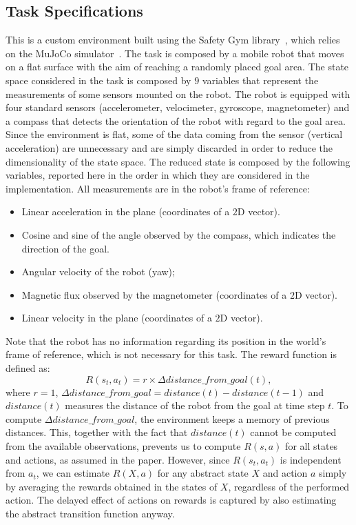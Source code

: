 \subsection*{Task Specifications}
This is a custom environment built using the Safety Gym library~\citep{ray2019benchmarking}, which relies on the MuJoCo simulator~\citep{todorov2012mujoco}. The task is composed by a mobile robot that moves on a flat surface with the aim of reaching a randomly placed goal area. The state space considered in the task is composed by $9$ variables that represent the measurements of some sensors mounted on the robot. The robot is equipped with four standard sensors (accelerometer, velocimeter, gyroscope, magnetometer) and a compass that detects the orientation of the robot with regard to the goal area. Since the environment is flat, some of the data coming from the sensor (\eg vertical acceleration) are unnecessary and are simply discarded in order to reduce the dimensionality of the state space. 
The reduced state is composed by the following variables, reported here in the order in which they are considered in the implementation. All measurements are in the robot's frame of reference:
\begin{itemize}
	\item Linear acceleration in the plane (coordinates of a $2$D vector).
	\item Cosine and sine of the angle observed by the compass, which indicates the direction of the goal.
	\item Angular velocity of the robot (\wrt yaw);
	\item Magnetic flux observed by the magnetometer (coordinates of a $2$D vector).
	\item Linear velocity in the plane (coordinates of a $2$D vector).
\end{itemize}
Note that the robot has no information regarding its position in the world's frame of reference, which is not necessary for this task.
The reward function is defined as:
\[ 
R(s_t, a_t) = r \times \Delta distance\_from\_goal(t),
\]
where $r=1$, $\Delta distance\_from\_goal = distance(t) - distance(t-1)$ and $distance(t)$ measures the distance of the robot from the goal at time step $t$.
To compute $\Delta distance\_from\_goal$, the environment keeps a memory of previous distances. This, together with the fact that $distance(t)$ cannot be computed from the available observations, prevents us to compute $R(s,a)$ for all states and actions, as assumed in the paper. However, since $R(s_t,a_t)$ is independent from $a_t$, we can estimate $R(X,a)$ for any abstract state $X$ and action $a$ simply by averaging the rewards obtained in the states of $X$, regardless of the performed action. The delayed effect of actions on rewards is captured by also estimating the abstract transition function anyway.
